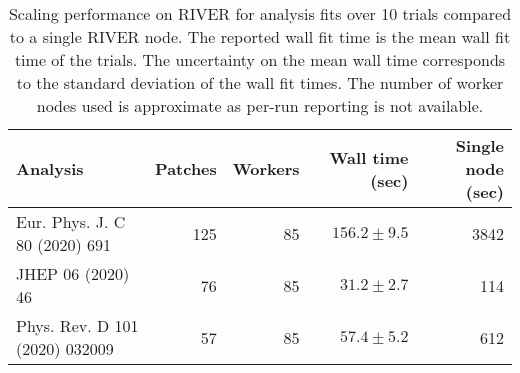 \begin{table}[htpb]
\centering
\caption{Scaling performance on RIVER for analysis fits over 10 trials compared to a single RIVER node. The reported wall fit time is the mean wall fit time of the trials. The uncertainty on the mean wall time corresponds to the standard deviation of the wall fit times. The number of worker nodes used is approximate as per-run reporting is not available.}
\label{table:performance}
\begin{tabular}{@{}lrrrr@{}}
\toprule
                      Analysis & Patches & Workers & Wall time (sec) & Single node (sec) \\
\midrule
 Eur. Phys. J. C 80 (2020) 691 &     125 &      85 &   $156.2\pm9.5$ &              3842 \\
             JHEP 06 (2020) 46 &      76 &      85 &    $31.2\pm2.7$ &               114 \\
Phys. Rev. D 101 (2020) 032009 &      57 &      85 &    $57.4\pm5.2$ &               612 \\
\bottomrule
\end{tabular}
\end{table}
